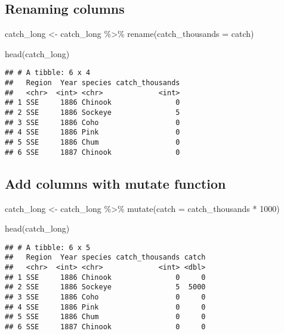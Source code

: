 \documentclass[
]{article}
\newenvironment{Shaded}{\begin{snugshade}}{\end{snugshade}}
\newcommand{\AttributeTok}[1]{\textcolor[rgb]{0.77,0.63,0.00}{#1}}
\newcommand{\DecValTok}[1]{\textcolor[rgb]{0.00,0.00,0.81}{#1}}
\newcommand{\FunctionTok}[1]{\textcolor[rgb]{0.00,0.00,0.00}{#1}}
\newcommand{\NormalTok}[1]{#1}
\newcommand{\OtherTok}[1]{\textcolor[rgb]{0.56,0.35,0.01}{#1}}
\newcommand{\SpecialCharTok}[1]{\textcolor[rgb]{0.00,0.00,0.00}{#1}}
\begin{document}
\hypertarget{renaming-columns}{%
\subsection{Renaming columns}\label{renaming-columns}}

\begin{Shaded}
\begin{Highlighting}[]
\NormalTok{catch\_long }\OtherTok{\textless{}{-}}\NormalTok{ catch\_long }\SpecialCharTok{\%\textgreater{}\%} 
  \FunctionTok{rename}\NormalTok{(}\AttributeTok{catch\_thousands =}\NormalTok{ catch)}

\FunctionTok{head}\NormalTok{(catch\_long)}
\end{Highlighting}
\end{Shaded}

\begin{verbatim}
## # A tibble: 6 x 4
##   Region  Year species catch_thousands
##   <chr>  <int> <chr>             <int>
## 1 SSE     1886 Chinook               0
## 2 SSE     1886 Sockeye               5
## 3 SSE     1886 Coho                  0
## 4 SSE     1886 Pink                  0
## 5 SSE     1886 Chum                  0
## 6 SSE     1887 Chinook               0
\end{verbatim}

\hypertarget{add-columns-with-mutate-function}{%
\subsection{Add columns with mutate
function}\label{add-columns-with-mutate-function}}

\begin{Shaded}
\begin{Highlighting}[]
\NormalTok{catch\_long }\OtherTok{\textless{}{-}}\NormalTok{ catch\_long }\SpecialCharTok{\%\textgreater{}\%} 
  \FunctionTok{mutate}\NormalTok{(}\AttributeTok{catch =}\NormalTok{ catch\_thousands }\SpecialCharTok{*} \DecValTok{1000}\NormalTok{)}

\FunctionTok{head}\NormalTok{(catch\_long)}
\end{Highlighting}
\end{Shaded}

\begin{verbatim}
## # A tibble: 6 x 5
##   Region  Year species catch_thousands catch
##   <chr>  <int> <chr>             <int> <dbl>
## 1 SSE     1886 Chinook               0     0
## 2 SSE     1886 Sockeye               5  5000
## 3 SSE     1886 Coho                  0     0
## 4 SSE     1886 Pink                  0     0
## 5 SSE     1886 Chum                  0     0
## 6 SSE     1887 Chinook               0     0
\end{verbatim}
\end{document}
